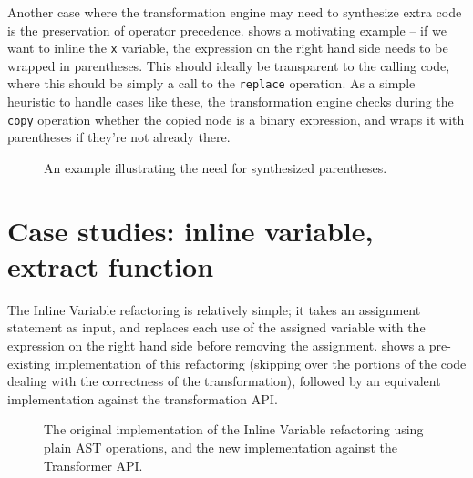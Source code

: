 Another case where the transformation engine may need to synthesize extra code
is the preservation of operator precedence.  shows
a motivating example -- if we want to inline the \texttt{x} variable, the
expression on the right hand side needs to be wrapped in parentheses. This
should ideally be transparent to the calling code, where this should be simply
a call to the \texttt{replace} operation. As a simple heuristic to handle cases
like these, the transformation engine checks during the \texttt{copy} operation
whether the copied node is a binary expression, and wraps it with parentheses
if they're not already there.

\begin{figure}
\begin{minipage}{0.5\linewidth}

\end{minipage}
\hfill \hspace{.3cm} \hfill
\begin{minipage}{0.5\linewidth}

\end{minipage}
\caption{An example illustrating the need for synthesized parentheses.}
\label{Fig:NeedParens}
\end{figure}

\section{Case studies: inline variable, extract function}

The Inline Variable refactoring is relatively simple; it takes an assignment
statement as input, and replaces each use of the assigned variable with the
expression on the right hand side before removing the assignment.
 shows a pre-existing implementation of this
refactoring (skipping over the portions of the code dealing with the
correctness of the transformation), followed by an equivalent implementation against
the transformation API.


\begin{figure}
\begin{minipage}{\linewidth}

\end{minipage}
\begin{minipage}{\linewidth}

\end{minipage}
\label{Fig:InlineVariableComparison}
\caption{The original implementation of the Inline Variable refactoring using plain
AST operations, and the new implementation against the Transformer API.}
\end{figure}

